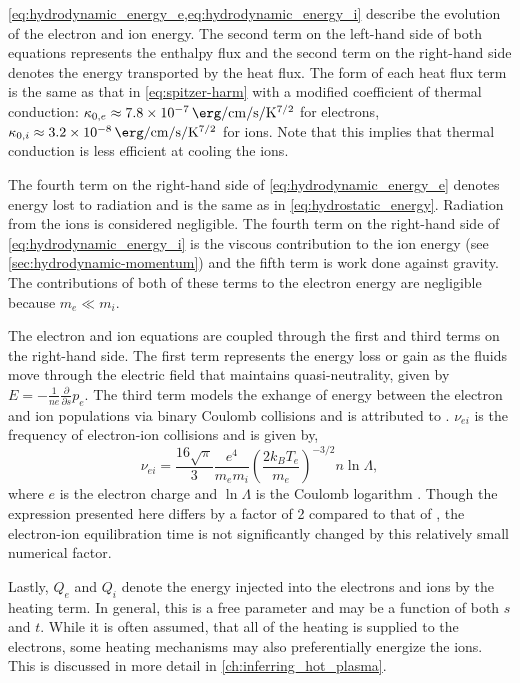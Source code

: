 \cref{eq:hydrodynamic_energy_e,eq:hydrodynamic_energy_i} describe the evolution of the electron and ion energy. The second term on the left-hand side of both equations represents the enthalpy flux and the second term on the right-hand side denotes the energy transported by the heat flux. The form of each heat flux term is the same as that in \autoref{eq:spitzer-harm} with a modified coefficient of thermal conduction: $\kappa_{0,e}\approx\SI{7.8e-7}{\erg\per\cm\per\second\per\kelvin\tothe{7/2}}$ for electrons, $\kappa_{0,i}\approx\SI{3.2e-8}{\erg\per\cm\per\second\per\kelvin\tothe{7/2}}$ for ions. Note that this implies that thermal conduction is less efficient at cooling the ions. 

The fourth term on the right-hand side of \autoref{eq:hydrodynamic_energy_e} denotes energy lost to radiation and is the same as in \autoref{eq:hydrostatic_energy}. Radiation from the ions is considered negligible. The fourth term on the right-hand side of \autoref{eq:hydrodynamic_energy_i} is the viscous contribution to the ion energy (see \autoref{sec:hydrodynamic-momentum}) and the fifth term is work done against gravity. The contributions of both of these terms to the electron energy are negligible because $m_e\ll m_i$.

The electron and ion equations are coupled through the first and third terms on the right-hand side. The first term represents the energy loss or gain as the fluids move through the electric field that maintains quasi-neutrality, given by $E=-\frac{1}{ne}\frac{\partial}{\partial s}p_e$. The third term models the exhange of energy between the electron and ion populations via binary Coulomb collisions and is attributed to \citet{braginskii_transport_1965}. $\nu_{ei}$ is the frequency of electron-ion collisions and is given by,
\begin{equation}\label{eq:col_freq}
    \nu_{ei} = \frac{16\sqrt{\pi}}{3}\frac{e^4}{m_em_i}\left(\frac{2k_BT_e}{m_e}\right)^{-3/2}n\ln{\Lambda},
\end{equation}
where $e$ is the electron charge and $\ln{\Lambda}$ is the Coulomb logarithm \citep[see both Eq. 2.5e and Section 3 of][]{braginskii_transport_1965}. Though the expression presented here differs by a factor of 2 compared to that of \citeauthor{braginskii_transport_1965}, the electron-ion equilibration time is not significantly changed by this relatively small numerical factor.

Lastly, $Q_e$ and $Q_i$ denote the energy injected into the electrons and ions by the heating term. In general, this is a free parameter and may be a function of both $s$ and $t$. While it is often assumed, that all of the heating is supplied to the electrons, some heating mechanisms may also preferentially energize the ions. This is discussed in more detail in \autoref{ch:inferring_hot_plasma}. 

